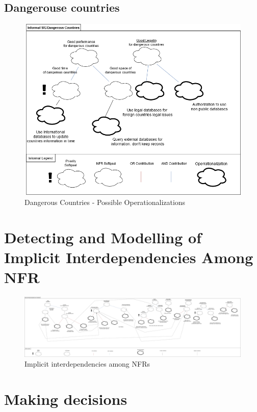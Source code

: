 \documentclass{VUMIFPSkursinis}
\begin{document}
\begin{landscape}
	\subsection{Dangerouse countries}
		\begin{figure}[H]
			\center
			\includegraphics[scale=0.5]{img/Dangerous-Countries-3}
			\caption{Dangerous Countries - Possible Operationalizations} %
			\label{img:kurimoProcesas}
		\end{figure}	

\section{Detecting and Modelling of Implicit Interdependencies Among NFR}
	\begin{figure}[H]
		\center
		\includegraphics[scale=0.2]{img/Negative-Interdependancies}
		\caption{Implicit interdependencies among NFRs} %
		\label{img:kurimoProcesas}
	\end{figure}
\section{Making decisions}

\end{landscape}
\end{document}

